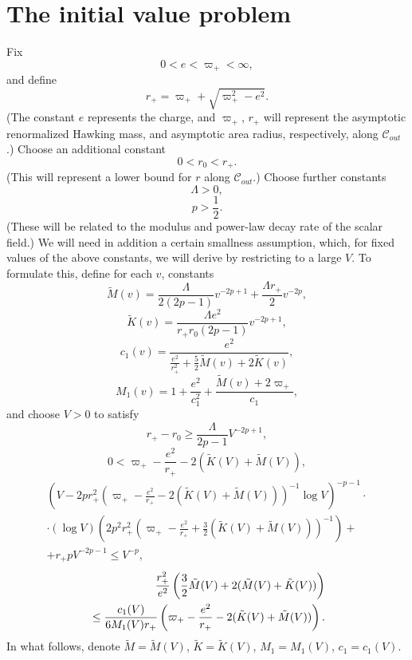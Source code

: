 \documentclass{article}
\begin{document}
\section{The initial value problem}
\label{ivpsec}
Fix 
\[
0<e<\varpi_+<\infty,
\]
and define 
\[
r_+=\varpi_++\sqrt{\varpi_+^2-e^2}.
\]
(The constant $e$ represents the charge,
and $\varpi_+$, $r_+$ will represent the asymptotic
renormalized Hawking mass, and asymptotic area radius, respectively,
along $\mathcal{C}_{out}$.)
Choose an additional constant
\[
0<r_0<r_+.
\]
(This will represent a lower bound for $r$ along $\mathcal{C}_{out}$.)
Choose further constants 
\[
\Lambda>0,
\]
\[
p>\frac12.
\] 
(These will be related to the modulus and power-law decay rate of
the scalar field.)
We will need in addition a certain smallness assumption, which,
for fixed values of the above constants, we will derive
by restricting to a large $V$. To formulate this, define for
each $v$,
constants
\[
\tilde{M}(v)=\frac{\Lambda}{2(2p-1)}v^{-2p+1}+
\frac{\Lambda r_+}2v^{-2p},
\]
\[
\tilde{K}(v)=\frac{\Lambda e^2}{r_+r_0(2p-1)}v^{-2p+1},
\]
\begin{equation}
\label{c_1ori}
c_1(v)=\frac{e^2}{\frac{e^2}{r_+^2}+\frac52\tilde{M}(v)+2\tilde{K}(v)},
\end{equation}
\begin{equation}
\label{M1ori}
M_1(v)=1+\frac{e^2}{c_1^2}+\frac{\tilde{M}(v)+2\varpi_+}{c_1},
\end{equation}
and choose
$V>0$ 
to satisfy
\begin{equation}
\label{giatorkatw}
r_+-r_0\ge\frac{\Lambda}{2p-1}V^{-2p+1},
\end{equation}
\begin{equation}
\label{alloxipriv}
0<\varpi_+-\frac{e^2}{r_+}-2(\tilde{K}(V)+\tilde{M}(V)),
\end{equation}
\begin{eqnarray}
\label{trello2}
\nonumber
\left(V-2pr_+^2
\left(\varpi_+-\frac{e^2}{r_+}-2(\tilde{K}(V)+\tilde{M}(V))
\right)^{-1}\log V\right)^{-p-1}\cdot\\
\nonumber
\cdot(\log V)\left(2p^2r_+^2
\left(\varpi_+-\frac{e^2}{r_+}+\frac32(\tilde{K}(V)+\tilde{M}(V))
\right)^{-1}\right)+\\
+r_+pV^{-2p-1}\le V^{-p},
\end{eqnarray}
\begin{eqnarray}
\label{trello}
\nonumber
\frac{r_+^2}{e^2}\left(\frac32\tilde{M}(V)+2(\tilde{M}(V)+\tilde{K}(V))\right)
\\
\hbox{}
\le\frac{c_1(V)}{6M_1(V)r_{+}}\left(\varpi_+-\frac{e^2}{r_+}-2(\tilde{K}(V)+\tilde{M}(V))
\right).
\end{eqnarray}
In what follows, denote $\tilde{M}=\tilde{M}(V)$, $\tilde{K}=\tilde{K}(V)$,
$M_1=M_1(V)$, $c_1=c_1(V)$.
\end{document}
